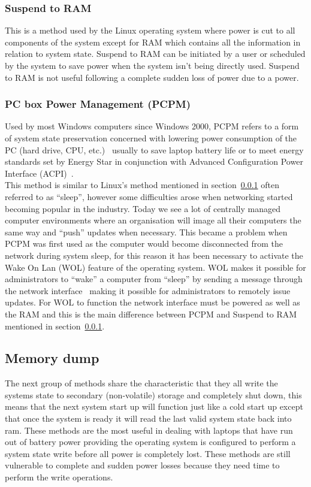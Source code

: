 \documentclass[a4paper,12pt]{article}
\begin{document}
\subsubsection{Suspend to RAM}\label{sec:stRam}
This is a method used by the Linux operating system where power is cut to all components of the system except for RAM which contains all the information in relation to system state.\citep{Wiki}
Suspend to RAM can be initiated by a user or scheduled by the system to save power when the system isn't being directly used. Suspend to RAM is not useful following a complete sudden loss of power due to a power.
\subsubsection{PC box Power Management (PCPM)}\label{sec:PCPM}
Used by most Windows computers since Windows 2000, PCPM refers to a form of system state preservation concerned with lowering power consumption of the PC (hard drive, CPU, etc.)~\citep{PCPM} usually to save laptop battery life or to meet energy standards set by Energy Star in conjunction with Advanced Configuration Power Interface (ACPI)~\citep{PCPM}.
\\This method is similar to Linux's method mentioned in section~\ref{sec:stRam} often referred to as ``sleep'', however some difficulties arose when networking started becoming popular in the industry. Today we see a lot of centrally managed computer environments where an organisation will image all their computers the same way and ``push'' updates when necessary. This became a problem when PCPM was first used as the computer would become disconnected from the network during system sleep, for this reason it has been necessary to activate the Wake On Lan (WOL) feature of the operating system. WOL makes it possible for administrators to ``wake'' a computer from ``sleep'' by sending a message through the network interface~\citep{WOL} making it possible for administrators to remotely issue updates. For WOL to function the network interface must be powered as well as the RAM and this is the main difference between PCPM and Suspend to RAM mentioned in section~\ref{sec:stRam}.

\subsection{Memory dump}\label{sec:memorydump}
The next group of methods share the characteristic that they all write the systems state to secondary (non-volatile) storage and completely shut down, this means that the next system start up will function just like a cold start up except that once the system is ready it will read the last valid system state back into ram.
These methods are the most useful in dealing with laptops that have run out of battery power providing the operating system is configured to perform a system state write before all power is completely lost. These methods are still vulnerable to complete and sudden power losses because they need time to perform the write operations.
\end{document}
